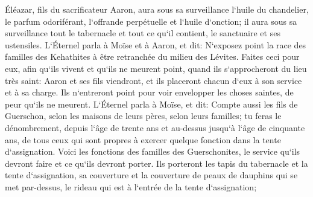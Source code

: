 \verse Éléazar, fils du sacrificateur Aaron, aura sous sa surveillance l`huile du chandelier, le parfum odoriférant, l`offrande perpétuelle et l`huile d`onction; il aura sous sa surveillance tout le tabernacle et tout ce qu`il contient, le sanctuaire et ses ustensiles. 
\verse L`Éternel parla à Moïse et à Aaron, et dit: 
\verse N`exposez point la race des familles des Kehathites à être retranchée du milieu des Lévites. 
\verse Faites ceci pour eux, afin qu`ils vivent et qu`ils ne meurent point, quand ils s`approcheront du lieu très saint: Aaron et ses fils viendront, et ils placeront chacun d`eux à son service et à sa charge. 
\verse Ils n`entreront point pour voir envelopper les choses saintes, de peur qu`ils ne meurent. 
\verse L`Éternel parla à Moïse, et dit: 
\verse Compte aussi les fils de Guerschon, selon les maisons de leurs pères, selon leurs familles; 
\verse tu feras le dénombrement, depuis l`âge de trente ans et au-dessus jusqu`à l`âge de cinquante ans, de tous ceux qui sont propres à exercer quelque fonction dans la tente d`assignation. 
\verse Voici les fonctions des familles des Guerschonites, le service qu`ils devront faire et ce qu`ils devront porter. 
\verse Ils porteront les tapis du tabernacle et la tente d`assignation, sa couverture et la couverture de peaux de dauphins qui se met par-dessus, le rideau qui est à l`entrée de la tente d`assignation; 
